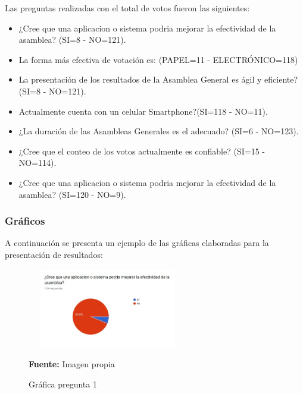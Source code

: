 \vspace{0.5cm}

Las preguntas realizadas con el total de votos fueron las siguientes:

\begin{itemize}
	\item ¿Cree que una aplicacion o sistema podria mejorar la efectividad de la asamblea? (SI=8 - NO=121).
	
	\item La forma más efectiva de votación es: (PAPEL=11 - ELECTRÓNICO=118)
	
	\item La presentación de los resultados de la Asamblea General es ágil y eficiente? (SI=8 - NO=121).
	
	\item Actualmente cuenta con un celular Smartphone?(SI=118 - NO=11).
	
	\item ¿La duración de las Asambleas Generales es el adecuado? (SI=6 - NO=123).
	
	\item ¿Cree que el conteo de los votos actualmente es confiable? (SI=15 - NO=114).
	
	\item ¿Cree que una aplicacion o sistema podria mejorar la efectividad de la asamblea? (SI=120 - NO=9).
\end{itemize}


\subsubsection{Gráficos}

A continuación se presenta un ejemplo de las gráficas elaboradas para la presentación de resultados:


\begin{figure}[th!]
	\centering
	\includegraphics[width=7cm,height=3.5cm]{desarrollo/resultados/imgs/pregunta-1}
	\caption{Gráfica pregunta 1}{\scriptsize \textbf{Fuente:} Imagen propia}
\end{figure}